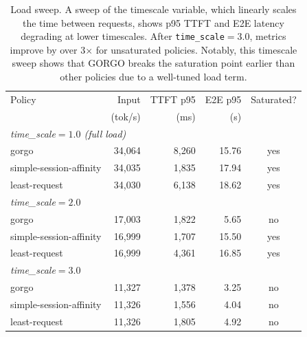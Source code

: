 \documentclass{article}
\begin{document}
\begin{table}[htbp]
\centering
\small
\setlength{\tabcolsep}{4.5pt}
\caption{Load sweep. A sweep of the timescale variable, which linearly scales the time between requests, shows
p95 TTFT and E2E latency degrading at lower timescales. After \texttt{time\_scale${=}3.0$}, metrics improve by over 3$\times$ for unsaturated policies. Notably,
this timescale sweep shows that GORGO breaks the saturation point earlier than other policies due to a well-tuned load term.}
\label{tab:loadsweep}
\begin{tabular}{lrrrc}
\toprule
Policy & Input & TTFT p95 & E2E p95 & Saturated? \\
       & (tok/s) & (ms)     & (s)     &            \\
\midrule
\multicolumn{5}{l}{\textit{time\_scale${=}1.0$ (full load)}} \\
\midrule
gorgo                   & 34{,}064 & 8{,}260 & 15.76 & yes \\
simple-session-affinity & 34{,}035 & 1{,}835 & 17.94 & yes \\
least-request           & 34{,}030 & 6{,}138 & 18.62 & yes \\
\midrule
\multicolumn{5}{l}{\textit{time\_scale${=}2.0$}} \\
\midrule
gorgo                   & 17{,}003 & 1{,}822 & 5.65  & no  \\
simple-session-affinity & 16{,}999 & 1{,}707 & 15.50 & yes \\
least-request           & 16{,}999 & 4{,}361 & 16.85 & yes \\
\midrule
\multicolumn{5}{l}{\textit{time\_scale${=}3.0$}} \\
\midrule
gorgo                   & 11{,}327 & 1{,}378 & 3.25  & no  \\
simple-session-affinity & 11{,}326 & 1{,}556 & 4.04  & no  \\
least-request           & 11{,}326 & 1{,}805 & 4.92  & no  \\
\bottomrule
\end{tabular}
\end{table}
\end{document}
